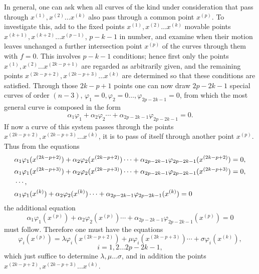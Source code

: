 \documentclass[10pt]{article}
\begin{document}
In general, one can ask when all curves of the kind under consideration that pass through \(x^{(1)},x^{(2)}\ldots x^{(k)}\) also pass through a common point \(x^{(p)}\). To investigate this, add to the fixed points \(x^{(1)},x^{(2)}\ldots x^{(k)}\) movable points \(x^{(k+1)},x^{(k+2)}\ldots x^{(p-1)}\), \(p-k-1\) in number, and examine when their motion leaves unchanged a further intersection point \(x^{(p)}\) of the curves through them with \(f=0\). This involves \(p-k-1\) conditions; hence first only the points \(x^{(1)},x^{(2)}\ldots x^{(2k-p+1)}\) are regarded as arbitrarily given, and the remaining points \(x^{(2k-p+2)},x^{(2k-p+3)}\ldots x^{(k)}\) are determined so that these conditions are satisfied. Through those \(2k-p+1\) points one can now draw \(2p-2k-1\) special curves of order \((n-3)\), \(\varphi_1=0,\varphi_2=0\ldots,\varphi_{2p-2k-1}=0\), from which the most general curve is composed in the form
\[
\alpha_1\varphi_1+\alpha_2\varphi_2\cdots+\alpha_{2p-2k-1}\varphi_{2p-2k-1}=0.
\]
If now a curve of this system passes through the points \(x^{(2k-p+2)},x^{(2k-p+3)}\ldots x^{(k)}\), it is to pass of itself through another point \(x^{(p)}\). Thus from the equations
\[
\begin{aligned}
&\alpha_1\varphi_1(x^{(2k-p+2)})+\alpha_2\varphi_2(x^{(2k-p+2)})\cdots+
\alpha_{2p-2k-1}\varphi_{2p-2k-1}(x^{(2k-p+2)})=0,\\
&\alpha_1\varphi_1(x^{(2k-p+3)})+\alpha_2\varphi_2(x^{(2k-p+3)})\cdots+
\alpha_{2p-2k-1}\varphi_{2p-2k-1}(x^{(2k-p+3)})=0,\\
&\hfill\cdots\hfill,\\
&\alpha_1\varphi_1(x^{(k)})+\alpha_2\varphi_2(x^{(k)})\cdots+
\alpha_{2p-2k-1}\varphi_{2p-2k-1}(x^{(k)})=0
\end{aligned}
\]
the additional equation
\[
\alpha_1\varphi_1(x^{(p)})+\alpha_2\varphi_2(x^{(p)})\cdots+
\alpha_{2p-2k-1}\varphi_{2p-2k-1}(x^{(p)})=0
\]
must follow. Therefore one must have the equations
\[
\varphi_i(x^{(p)})=\lambda\varphi_i(x^{(2k-p+2)})+
\mu\varphi_i(x^{(2k-p+3)})\cdots+
\sigma\varphi_i(x^{(k)}),
\]
\[
i=1,2\ldots 2p-2k-1,
\]
which just suffice to determine \(\lambda,\mu\ldots\sigma\), and in addition the points \(x^{(2k-p+2)},x^{(2k-p+3)}\ldots x^{(k)}\).
\end{document}
